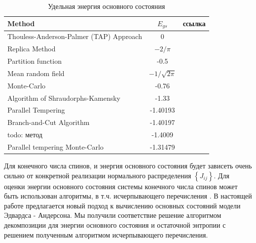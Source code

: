 \documentclass[utf8, babel, sor, jor, amsmath, amssymb, reprint]{elsarticle} %
\begin{document}
\begin{table}[!h]
	\begin{tabular}{|l|c|l|}
		\hline
		Method                                   & $E_{gs}$                                       & ссылка                                          \\ \hline
		Thouless-Anderson-Palmer (TAP) Approach & 0                                              & \cite{thouless1977solution}    \\ \hline
		Replica Method                            & $-2/\pi$                                       & \cite{sherrington1975solvable} \\ \hline
		Partition function                      & -0.5                                           & \cite{tanaka1980analytic}      \\ \hline
		Mean random field                       & $-1/\sqrt{2\pi}$                               & \cite{klein1976comparison}     \\ \hline
		Monte-Carlo                             & -0.76                                          & \cite{kirkpatrick1978infinite} \\ \hline
		Algorithm of Shraudorphs-Kamensky        & -1.33                                          & \cite{karandashev2019global}   \\ \hline
		Parallel Tempering   & -1.40193                                       & \cite{palmer1999ground}        \\ \hline
		  Branch-and-Cut Algorithm              & -1.40197                         
		                                        & \cite{campbell2004energy}      \\ \hline
		todo: метод                                        & -1.4009                                        & \cite{roma2009ground}          \\ \hline
		Parallel tempering Monte-Carlo  & -1.31479                                       & \cite{roma2009ground}          \\ \hline
	\end{tabular}
	\label{tab:Egs}
	\caption{Удельная энергия основного состояния}
\end{table}

Для конечного числа спинов, и энергия основного состояния будет зависеть очень сильно от конкретной реализации нормального распределения $\left\lbrace J_{ij} \right\rbrace $. Для оценки энергии основного состояния системы конечного числа спинов может быть использован алгоритмы, в т.ч. исчерпывающего перечисления \cite{padalko2021parallel}. В настоящей работе предлагается новый подход к вычислению основных состояний модели Эдвардса - Андерсона. Мы получили соответствие решение алгоритмом декомпозиции для энергии основного состояния и остаточной энтропии с решением полученным алгоритмом исчерпывающего перечисления.  
\end{document}
